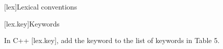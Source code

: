 
[lex]{Lexical conventions}

[lex.key]{Keywords}

\pnum
In C++ [lex.key], add the keyword  to the list of
keywords in Table 5.
